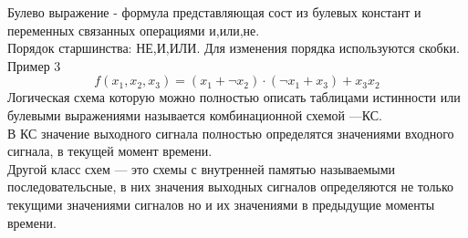 Булево выражение - формула представляющая сост из булевых констант и переменных связанных операциями и,или,не.\\
Порядок старшинства: НЕ,И,ИЛИ. Для изменения порядка используются скобки.\\
Пример 3
$$f(x_1 ,x_2 ,x_3)= (x_1 + \neg x_2) \cdot (\neg x_1 + x_3) + x_3 x_2 $$
Логическая схема которую можно полностью описать таблицами истинности или булевыми выражениями называется комбинационной схемой —КС.\\
В КС значение выходного сигнала полностью определятся значениями входного сигнала, в текущей момент времени.\\
Другой класс схем — это схемы с внутренней памятью называемыми последовательсные, в них значения выходных сигналов определяются не только текущими значениями сигналов но и их значениями в предыдущие моменты времени.\\
